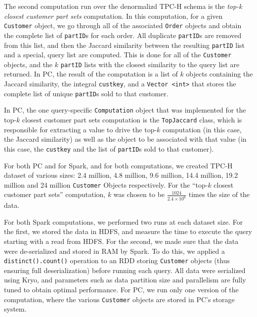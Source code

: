 The second computation run over the denormalizd TPC-H schema is the \emph{top-k closest customer part sets} computation.
In this computation, 
for a given
\texttt{Customer} object, we go through all of the associated 
\texttt{Order} objects and obtain the complete list of
\texttt{partID}s for each order.  All duplicate \texttt{partID}s are
removed from this list, and then the Jaccard similarity between the resulting \texttt{partID} list and a special, query
list are computed.  This is done for all of the \texttt{Customer} objects, and the $k$ \texttt{partID} lists with the 
closest similarity to the query list are returned.
In PC,
the result of the computation is a list of $k$ objects containing the Jaccard similarity, the integral \texttt{custkey}, and
a \texttt{Vector <int>} that stores the complete list of unique
\texttt{partID}s sold to that customer.

In PC, the one query-specific \texttt{Computation} object that was implemented for the top-$k$ 
closest customer part sets computation is the \texttt{TopJaccard} class, which
is responsible for extracting a value to drive the top-$k$ computation (in this case, the Jaccard similarity) as well
as the object to be associated with that value (in this case, the \texttt{custkey} and the list of 
\texttt{partID}s sold to that customer).

For both PC and for Spark, and for both computations, we created 
TPC-H dataset of various sizes: 2.4 million,
4.8 million, 9.6 million, 14.4 million, 19.2 million and 24 million
\texttt{Customer} Objects respectively.  For the ``top-$k$
closest customer part sets'' computation, $k$ was chosen to be $\frac{1024}{2.4 \times 10^6}$ times the size
of the data.

For both Spark computations, we performed two runs at each dataset size.
For the first, we stored the data in HDFS, and measure the time to execute the query starting with a
read from HDFS.
For the second, we made sure that the data were de-serialized and stored in RAM by Spark.
To do this, we applied a \texttt{distinct().count()} operation to
an RDD storing \texttt{Customer} objects (thus ensuring full deserialization) before running each query.
All data were
serialized using Kryo, and parameters such as data partition size and parallelism are fully tuned to obtain
optimal performance. 
For PC, we run only one version of the computation, where the various \texttt{Customer} objects are stored in
PC's storage system.


